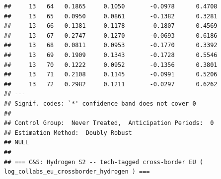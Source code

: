 \documentclass[
]{article}
\begin{document}
\begin{verbatim}
##     13   64   0.1865     0.1050       -0.0978      0.4708  
##     13   65   0.0950     0.0861       -0.1382      0.3281  
##     13   66   0.1381     0.1178       -0.1807      0.4569  
##     13   67   0.2747     0.1270       -0.0693      0.6186  
##     13   68   0.0811     0.0953       -0.1770      0.3392  
##     13   69   0.1909     0.1343       -0.1728      0.5546  
##     13   70   0.1222     0.0952       -0.1356      0.3801  
##     13   71   0.2108     0.1145       -0.0991      0.5206  
##     13   72   0.2982     0.1211       -0.0297      0.6262  
## ---
## Signif. codes: `*' confidence band does not cover 0
## 
## Control Group:  Never Treated,  Anticipation Periods:  0
## Estimation Method:  Doubly Robust
## NULL
## 
## === C&S: Hydrogen S2 -- tech-tagged cross-border EU ( log_collabs_eu_crossborder_hydrogen ) ===
\end{verbatim}
\end{document}
